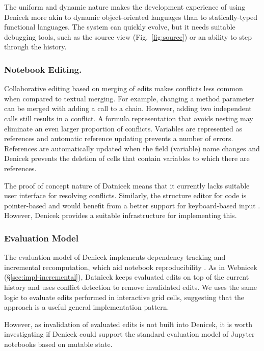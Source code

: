\documentclass[sigconf]{acmart}
\begin{document}
The uniform and dynamic nature makes the development experience of using Denicek more akin to dynamic
object-oriented languages than to statically-typed functional languages. The system can quickly evolve,
but it needs suitable debugging tools, such as the source view (Fig.~\ref{fig:source}) or an
ability to step through the history.


\subsubsection*{Notebook Editing.}
Collaborative editing based on merging of edits makes conflicts less common when compared to
textual merging. For example, changing a method parameter can be merged with adding a call
to a chain. However, adding two independent calls still results in a conflict. A formula
representation that avoids nesting \cite{petricek-2019-histogram} may eliminate an even larger
proportion of conflicts.
%
Variables are represented as references and automatic reference updating %
prevents a number of errors. References are automatically updated when the field (variable) name changes
and Denicek prevents the deletion of cells that contain variables to which there are references.

The proof of concept nature of Datnicek means that it currently lacks suitable user interface for
resolving conflicts. Similarly, the structure editor for code is pointer-based and would benefit from
a better support for keyboard-based input \cite{moon-2022-tylr,beckman-2023-sandblocks}.
However, Denicek provides a suitable infrastructure for implementing this.

\subsubsection*{Evaluation Model}
The evaluation model of Denicek implements dependency tracking and incremental recomputation,
which aid notebook reproducibility \cite{petricek-2018-wrattler,koop-2017-dataflow}. As in
Webnicek (\S\ref{sec:impl-incremental}), Datnicek keeps evaluated edits on top of the current history
and uses conflict detection to remove invalidated edits. We uses the same logic to evaluate
edits performed in interactive grid cells, suggesting that the approach is a useful general
implementation pattern.

However, as invalidation of evaluated edits is not built into Deni\-cek, it is worth investigating
if Denicek could support the standard evaluation model of Jupyter notebooks based on mutable state.
\end{document}
